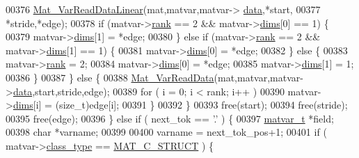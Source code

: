 \begin{DoxyCode}
{{{{{{00376                     \hyperlink{group___m_a_t_gaad61c8449a2106afa697280ff0ee9dd8}{Mat\_VarReadDataLinear}(mat,matvar,matvar->
      \hyperlink{group___m_a_t_a5672978efa230bbdecdf38ede781f7fa}{data},*start,
00377                                          *stride,*edge);
00378                     \textcolor{keywordflow}{if} (matvar->\hyperlink{group___m_a_t_a84ba70c96ded13cc555fa75b768d9921}{rank} == 2 && matvar->\hyperlink{group___m_a_t_a8e01234e1c862ce3472bb37f5a09b92c}{dims}[0] == 1) \{
00379                        matvar->\hyperlink{group___m_a_t_a8e01234e1c862ce3472bb37f5a09b92c}{dims}[1] = *edge;
00380                     \} \textcolor{keywordflow}{else} \textcolor{keywordflow}{if} (matvar->\hyperlink{group___m_a_t_a84ba70c96ded13cc555fa75b768d9921}{rank} == 2 && matvar->\hyperlink{group___m_a_t_a8e01234e1c862ce3472bb37f5a09b92c}{dims}[1] == 1) \{
00381                        matvar->\hyperlink{group___m_a_t_a8e01234e1c862ce3472bb37f5a09b92c}{dims}[0] = *edge;
00382                     \} \textcolor{keywordflow}{else} \{
00383                         matvar->\hyperlink{group___m_a_t_a84ba70c96ded13cc555fa75b768d9921}{rank} = 2;
00384                         matvar->\hyperlink{group___m_a_t_a8e01234e1c862ce3472bb37f5a09b92c}{dims}[0] = *edge;
00385                         matvar->\hyperlink{group___m_a_t_a8e01234e1c862ce3472bb37f5a09b92c}{dims}[1] = 1;
00386                     \}
00387                 \} \textcolor{keywordflow}{else} \{
00388                     \hyperlink{group___m_a_t_ga1845000f4fc6252ec5ff11c4b9f0759f}{Mat\_VarReadData}(mat,matvar,matvar->\hyperlink{group___m_a_t_a5672978efa230bbdecdf38ede781f7fa}{data},start,stride,edge);
00389                     \textcolor{keywordflow}{for} ( i = 0; i < rank; i++ )
00390                         matvar->\hyperlink{group___m_a_t_a8e01234e1c862ce3472bb37f5a09b92c}{dims}[i] = (\textcolor{keywordtype}{size\_t})edge[i];
00391                 \}
00392             \}
00393             free(start);
00394             free(stride);
00395             free(edge);
00396         \} \textcolor{keywordflow}{else} \textcolor{keywordflow}{if} ( next\_tok == \textcolor{charliteral}{'.'} ) \{
00397             \hyperlink{group___m_a_t_structmatvar__t}{matvar\_t} *field;
00398             \textcolor{keywordtype}{char} *varname;
00399 
00400             varname = next\_tok\_pos+1;
00401             \textcolor{keywordflow}{if} ( matvar->\hyperlink{group___m_a_t_aff13035bf3265dd7d9425e5d40c839d4}{class\_type} == \hyperlink{group___m_a_t_ggad4d60ae7b709fc81bfd744fb4c857c40acb467c7749c80902b798134c729bb521}{MAT\_C\_STRUCT} ) \{
}}}}}}
\end{DoxyCode}
